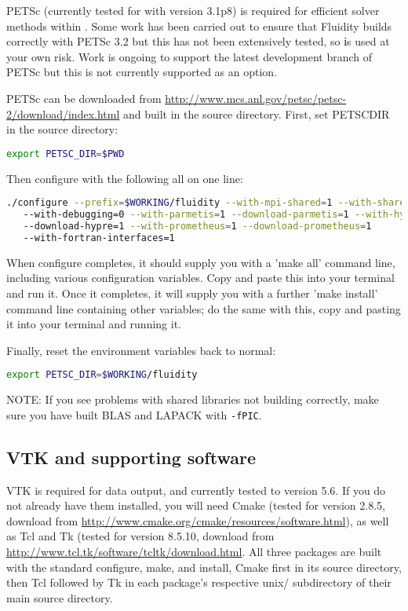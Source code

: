 PETSc (currently tested for \fluidity with version 3.1p8) is required for
efficient solver methods within \fluidity. Some work has been carried out
to ensure that Fluidity builds correctly with PETSc 3.2 but this has not
been extensively tested, so іs used at your own risk. Work is ongoing to
support the latest development branch of PETSc but this is not currently
supported as an option.

PETSc can be downloaded from
\url{http://www.mcs.anl.gov/petsc/petsc-2/download/index.html} and built in the
source directory. First, set PETSC{\textunderscore}DIR in the source directory:

\begin{lstlisting}[language=bash]
export PETSC_DIR=$PWD
\end{lstlisting}

Then configure with the following all on one line:

\begin{lstlisting}[language=bash]
./configure --prefix=$WORKING/fluidity --with-mpi-shared=1 --with-shared=1
   --with-debugging=0 --with-parmetis=1 --download-parmetis=1 --with-hypre=1
   --download-hypre=1 --with-prometheus=1 --download-prometheus=1
   --with-fortran-interfaces=1
\end{lstlisting}

When configure completes, it should supply you with a 'make all' command line,
including various configuration variables. Copy and paste this into your
terminal and run it. Once it completes, it will supply you with a further 'make
install' command line containing other variables; do the same with this, copy
and pasting it into your terminal and running it. 

Finally, reset the environment variables back to normal:

\begin{lstlisting}[language=bash]
export PETSC_DIR=$WORKING/fluidity
\end{lstlisting}

NOTE: If you see problems with shared libraries not building correctly, make
sure you have built BLAS and LAPACK with \lstinline[language=bash]+-fPIC+.

\subsection{VTK and supporting software}
\label{sec:required_libraries_vtk}

VTK is required for \fluidity data output, and currently tested to version 5.6.
If you do not already have them installed, you will need Cmake (tested for
version 2.8.5, download from
\url{http://www.cmake.org/cmake/resources/software.html}), as well as Tcl and
Tk (tested for version 8.5.10, download from
\url{http://www.tcl.tk/software/tcltk/download.html}. All three packages are
built with the standard configure, make, and install, Cmake first in its source
directory, then Tcl followed by Tk in each package's respective unix/
subdirectory of their main source directory.

